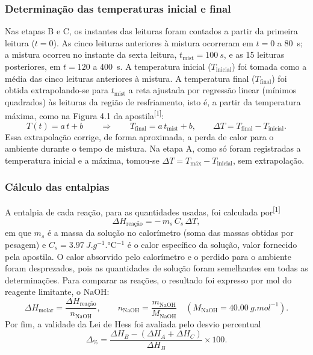 \subsubsection{Determinação das temperaturas inicial e final}
 Nas etapas B e C, os instantes das leituras foram contados a partir da primeira leitura ($t = 0$). As cinco leituras anteriores à mistura ocorreram em $t = 0$ a \SI{80}{s}; a mistura ocorreu no instante da sexta leitura, $t_{\text{mist}} = \SI{100}{s}$, e as 15 leituras posteriores, em $t = 120$ a \SI{400}{s}. A temperatura inicial ($T_{\text{inicial}}$) foi tomada como a média das cinco leituras anteriores à mistura. A temperatura final ($T_{\text{final}}$) foi obtida extrapolando-se para $t_{\text{mist}}$ a reta ajustada por regressão linear (mínimos quadrados) às leituras da região de resfriamento, isto é, a partir da temperatura máxima, como na Figura 4.1 da apostila\textsuperscript{[1]}:
 \[
    T(t) = a\,t + b
    \qquad\Rightarrow\qquad
    T_{\text{final}} = a\,t_{\text{mist}} + b ,
    \qquad
    \Delta T = T_{\text{final}} - T_{\text{inicial}} .
 \]
 Essa extrapolação corrige, de forma aproximada, a perda de calor para o ambiente durante o tempo de mistura. Na etapa A, como só foram registradas a temperatura inicial e a máxima, tomou-se $\Delta T = T_{\text{máx}} - T_{\text{inicial}}$, sem extrapolação.

 \subsubsection{Cálculo das entalpias}
 A entalpia de cada reação, para as quantidades usadas, foi calculada por\textsuperscript{[1]}
 \[
    \Delta H_{\text{reação}} = -\,m_s\,C_s\,\Delta T ,
 \]
 em que $m_s$ é a massa da solução no calorímetro (soma das massas obtidas por pesagem) e $C_s = \SI{3,97}{J.g^{-1}.\degreeCelsius^{-1}}$ é o calor específico da solução, valor fornecido pela apostila. O calor absorvido pelo calorímetro e o perdido para o ambiente foram desprezados, pois as quantidades de solução foram semelhantes em todas as determinações. Para comparar as reações, o resultado foi expresso por mol do reagente limitante, o $\mathrm{NaOH}$:
 \[
    \Delta H_{\text{molar}} = \frac{\Delta H_{\text{reação}}}{n_{\mathrm{NaOH}}},
    \qquad
    n_{\mathrm{NaOH}} = \frac{m_{\mathrm{NaOH}}}{M_{\mathrm{NaOH}}}
    \quad (M_{\mathrm{NaOH}} = \SI{40,00}{g.mol^{-1}}).
 \]
 Por fim, a validade da Lei de Hess foi avaliada pelo desvio percentual
 \[
    \Delta_{\%} = \frac{\Delta H_B - (\Delta H_A + \Delta H_C)}{\Delta H_B}\times 100 .
 \]
